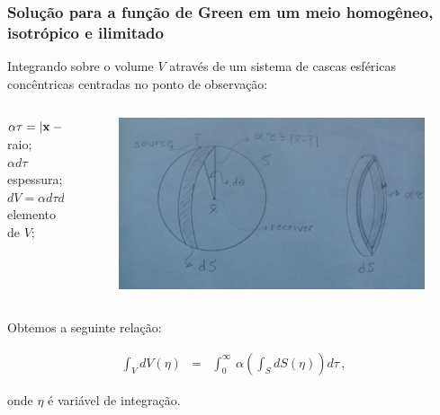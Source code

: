 \documentclass[xcolor=table]{beamer}
\newcommand{\xvec}{\mathbf{x}}
\newcommand{\xivec}{\boldmath \xi}
\begin{document}
\begin{frame}
\frametitle{\textbf{Solu\c{c}\~ao para a fun\c{c}\~ao de Green em um meio homog\^eneo, isotr\'opico e ilimitado}}
   \begin{flushleft}
        \textcolor{red!60!black}{
        Integrando sobre o volume $V$ atrav\'es de um sistema de cascas esf\'ericas conc\^entricas centradas no ponto de observa\c{c}\~ao:}
   \end{flushleft}
   \begin{columns}
  \begin{column}{0.40\textwidth}  
\begin{flushleft}
 $\alpha\tau = \left|\xvec - \xivec \right|$ {\scriptsize \hspace{0.3cm} raio;} \\
 $\alpha d\tau$       {\scriptsize \hspace{1.7cm}    espessura;}\\ 
 $dV = \alpha d\tau dS$ {\scriptsize \hspace{0.3cm}  elemento de $V$;}
\end{flushleft}  
  \end{column}
\begin{column}{0.40\textwidth}   
  \begin{figure}[h!]   
   \includegraphics[scale=0.045]{Figura/Fig1.jpg}       
  \end{figure}
  \end{column}
\end{columns}

\begin{flushleft}
Obtemos a seguinte rela\c{c}\~ao:
\end{flushleft}
\begin{eqnarray}
 \int_{V}dV(\eta) &=& \int_{0}^{\infty} \, \alpha \left( \int_{S} dS(\eta) \right) d\tau\, , 
\end{eqnarray}
\begin{flushleft}
onde $\eta$ \'e vari\'avel de integra\c{c}\~ao.
\end{flushleft}


\end{frame}%
\end{document}
